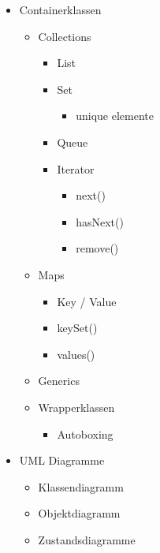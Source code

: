 \begin{itemize}
    \item Containerklassen
    \begin{itemize}
        \item Collections
        \begin{itemize}
            \item List
            \item Set
            \begin{itemize}
                \item unique elemente
            \end{itemize}
            \item Queue
            \item Iterator
            \begin{itemize}
                \item next()
                \item hasNext()
                \item remove()
            \end{itemize}
        \end{itemize}
        \item Maps
        \begin{itemize}
            \item Key / Value
            \item keySet()
            \item values()
        \end{itemize}
        \item Generics
        \item Wrapperklassen
        \begin{itemize}
            \item Autoboxing
        \end{itemize}
    \end{itemize}
    
    \item UML Diagramme
    \begin{itemize}
        \item Klassendiagramm
        \item Objektdiagramm
        \item Zustandsdiagramme
    \end{itemize}
    

\end{itemize}

